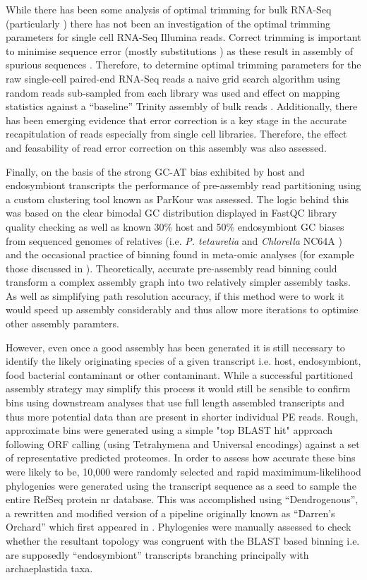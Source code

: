 While there has been some analysis of optimal trimming for bulk RNA-Seq (particularly \citep{MacManes2014})
there has not been an investigation of the optimal trimming parameters for single cell RNA-Seq Illumina reads.
Correct trimming is important to minimise sequence error (mostly substitutions \citep{Yang2013}) as these
result in assembly of spurious sequences \citep{Macmanes2013,MacManes2014}.  Therefore, to determine
optimal trimming parameters for the raw single-cell paired-end RNA-Seq reads 
a naive grid search algorithm using random reads sub-sampled from each library was used and effect on mapping
statistics against a ``baseline'' Trinity assembly of bulk reads \citep{Haas2013}.
Additionally, there has been emerging evidence that error correction is a key stage in the accurate
recapitulation of reads especially from single cell libraries.  Therefore, the effect and feasability 
of read error correction on this assembly was also assessed.

Finally, on the basis of the strong GC-AT bias exhibited by host and endosymbiont transcripts
the performance of pre-assembly read partitioning using a custom clustering tool known as
ParKour was assessed.  The logic behind this was based on the clear bimodal GC distribution
displayed in FastQC library quality checking as well as known 30\% host and 50\% endosymbiont
GC biases from sequenced genomes of relatives (i.e. \textit{P. tetaurelia} \citep{Aury2006} and 
\textit{Chlorella} NC64A \citep{Blanc2010a}) and the occasional practice of binning found in
meta-omic analyses (for example those discussed in \citep{Droge2012}).  Theoretically, accurate
pre-assembly read binning could transform a complex assembly graph into two relatively simpler
assembly tasks.  As well as simplifying path resolution accuracy, if this method were to work
it would speed up assembly considerably and thus allow more iterations to optimise other
assembly paramters.


However, even once a good assembly has been generated it is still necessary to identify the likely
originating species of a given transcript i.e. host, endosymbiont, food bacterial contaminant or other
contaminant.  While a successful partitioned assembly strategy may simplify this process it would still
be sensible to confirm bins using downstream analyses that use full length assembled transcripts and thus
more potential data than are present in shorter individual PE reads.  Rough, approximate bins were
generated using a simple "top BLAST hit" approach following ORF calling (using Tetrahymena and Universal
encodings) against a set of representative predicted proteomes.  In order to assess how accurate these
bins were likely to be, 10,000 were randomly selected and rapid maximimum-likelihood phylogenies were
generated using the transcript sequence as a seed to sample the entire RefSeq protein nr database.
This was accomplished using ``Dendrogenous'', a rewritten and modified version of a pipeline originally known 
as ``Darren's Orchard'' which first appeared in \citep{Richards2009g}.  Phylogenies were manually assessed to check
whether the resultant topology was congruent with the BLAST based binning i.e. are supposedly ``endosymbiont''
transcripts branching principally with archaeplastida taxa.  


